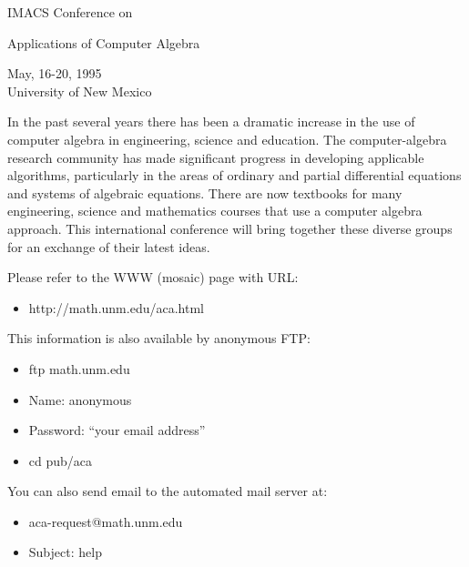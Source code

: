 

\begin{Large}
\begin{center}
IMACS Conference on \\
\begin{LARGE}
Applications of Computer Algebra \\
\end{LARGE}
May, 16-20, 1995 \\
University of New Mexico \\
\end{center}

In the past several years there has been a dramatic increase in the use
of computer algebra in engineering, science and education.  The
computer-algebra research community has made significant progress in
developing applicable algorithms, particularly in the areas of ordinary
and partial differential equations and systems of algebraic equations.
There are now textbooks for many engineering, science and mathematics
courses that use a computer algebra approach.  This international
conference will bring together these diverse groups for an exchange
of their latest ideas.

Please refer to the WWW (mosaic) page with URL:
\begin{itemize}
\item http://math.unm.edu/aca.html
\end{itemize}
This information is also available by anonymous FTP:
\begin{itemize}
\item ftp math.unm.edu
\item Name: anonymous
\item Password: ``your email address''
\item cd pub/aca
\end{itemize}
You can also send email to the automated mail server at:
\begin{itemize}
\item aca-request@math.unm.edu
\item Subject: help
\end{itemize}
\end{Large}
\newpage



